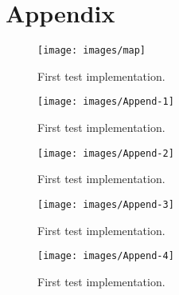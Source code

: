 \documentclass[12pt]{article}
\numberwithin{equation}{section} %
\numberwithin{figure}{section} %
\numberwithin{table}{section} %
\begin{document}
\section{Appendix}	
	\begin{figure}[H]
		\centering		
		\texttt{[image: images/map]}
		\caption{First test implementation.}
	\end{figure}
	\begin{figure}[H]
		\centering		
		\texttt{[image: images/Append-1]}
		\caption{First test implementation.}
	\end{figure}
	\begin{figure}[H]
		\centering		
		\texttt{[image: images/Append-2]}
		\caption{First test implementation.}
	\end{figure}
	\begin{figure}[H]
		\centering		
		\texttt{[image: images/Append-3]}
		\caption{First test implementation.}
	\end{figure}
	
	\begin{figure}[H]
		\centering		
		\texttt{[image: images/Append-4]}
		\caption{First test implementation.}
	\end{figure}


\begin{flushleft}
	
	
\end{flushleft}
\end{document}
